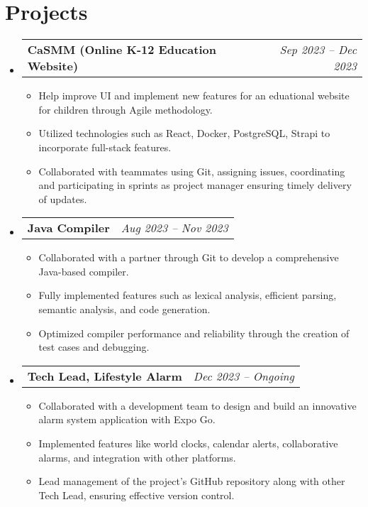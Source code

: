 \documentclass[letterpaper,11pt]{article}
\makeatletter
\newcommand{\resumeItemExperience}[1]{
  \item\small{
    {#1 \vspace{-2pt}}
  }
}
\newcommand{\resumeSubheadingProject}[2]{
  \vspace{-1pt}\item
    \begin{tabular*}{0.97\textwidth}{l@{\extracolsep{\fill}}r}
      \textbf{#1} & \textit{\small #2} \\
    \end{tabular*}\vspace{-5pt}
}
\newcommand{\resumeSubHeadingListStart}{\begin{itemize}[leftmargin=*, label={}]}
\newcommand{\resumeSubHeadingListEnd}{\end{itemize}}
\newcommand{\resumeItemListStart}{\begin{itemize}}
\newcommand{\resumeItemListEnd}{\end{itemize}\vspace{-5pt}}
\makeatother
\begin{document}
\section{Projects}
  \resumeSubHeadingListStart
        \resumeSubheadingProject
          {CaSMM (Online K-12 Education Website)}{Sep 2023 -- Dec 2023}
          \resumeItemListStart
            \resumeItemExperience
              {Help improve UI and implement new features for an eduational website for children through Agile methodology.}
            \resumeItemExperience
              {Utilized technologies such as React, Docker, PostgreSQL, Strapi to incorporate full-stack features.}
            \resumeItemExperience
              {Collaborated with teammates using Git, assigning issues, coordinating and participating in sprints as project manager ensuring timely delivery of updates.}
          \resumeItemListEnd
        \resumeSubheadingProject
          {Java Compiler}{Aug 2023 -- Nov 2023}
          \resumeItemListStart
            \resumeItemExperience
              {Collaborated with a partner through Git to develop a comprehensive Java-based compiler.}
            \resumeItemExperience
              {Fully implemented features such as lexical analysis, efficient parsing, semantic analysis, and code generation.}
            \resumeItemExperience
              {Optimized compiler performance and reliability through the creation of test cases and debugging.}
          \resumeItemListEnd
        \resumeSubheadingProject
          {Tech Lead, Lifestyle Alarm}{Dec 2023 -- Ongoing}
          \resumeItemListStart
            \resumeItemExperience
              {Collaborated with a development team to design and build an innovative alarm system application with Expo Go.}
            \resumeItemExperience
              {Implemented features like world clocks, calendar alerts, collaborative alarms, and integration with other platforms.}
            \resumeItemExperience
              {Lead management of the project’s GitHub repository along with other Tech Lead, ensuring effective version control.}
          \resumeItemListEnd
    \resumeSubHeadingListEnd
    
\end{document}
